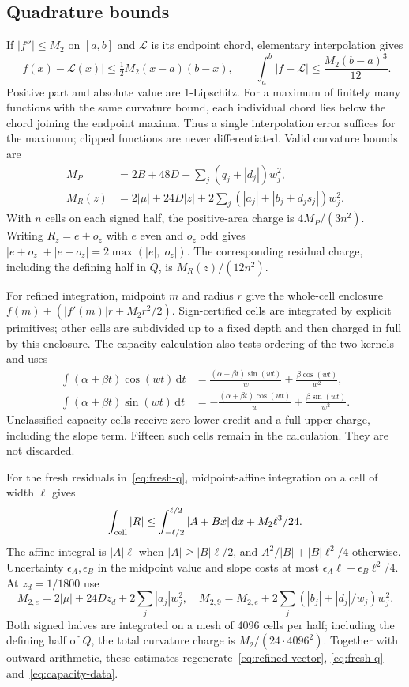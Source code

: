 \documentclass[10pt]{article}
\newcommand{\dd}{\,\mathrm d}
\begin{document}
\subsection{Quadrature bounds}
If $|f''|\leq M_2$ on $[a,b]$ and $\mathcal L$ is its endpoint chord, elementary interpolation gives
\[
|f(x)-\mathcal L(x)|\leq\tfrac12M_2(x-a)(b-x),\qquad
\int_a^b|f-\mathcal L|\leq\frac{M_2(b-a)^3}{12}.
\]
Positive part and absolute value are 1-Lipschitz.
For a maximum of finitely many functions with the same curvature bound, each individual chord lies below the chord joining the endpoint maxima. Thus a single interpolation error suffices for the maximum; clipped functions are never differentiated.
Valid curvature bounds are
\begin{align*}
M_P&=2B+48D+\sum_j(q_j+|d_j|)w_j^2,\\
M_R(z)&=2|\mu|+24D|z|+2\sum_j(|a_j|+|b_j+d_js_j|)w_j^2.
\end{align*}
With $n$ cells on each signed half, the positive-area charge is $4M_P/(3n^2)$.
Writing $R_z=e+o_z$ with $e$ even and $o_z$ odd gives
$|e+o_z|+|e-o_z|=2\max(|e|,|o_z|)$.
The corresponding residual charge, including the defining half in $Q$, is $M_R(z)/(12n^2)$.

For refined integration, midpoint $m$ and radius $r$ give the whole-cell enclosure
$f(m)\pm(|f'(m)|r+M_2r^2/2)$.
Sign-certified cells are integrated by explicit primitives; other cells are subdivided up to a fixed depth and then charged in full by this enclosure.
The capacity calculation also tests ordering of the two kernels and uses
\begin{align*}
\int(\alpha+\beta t)\cos(wt)\dd t
 &=\frac{(\alpha+\beta t)\sin(wt)}w+\frac{\beta\cos(wt)}{w^2},\\
\int(\alpha+\beta t)\sin(wt)\dd t
 &=-\frac{(\alpha+\beta t)\cos(wt)}w+\frac{\beta\sin(wt)}{w^2}.
\end{align*}
Unclassified capacity cells receive zero lower credit and a full upper charge, including the slope term. Fifteen such cells remain in the calculation. They are not discarded.

For the fresh residuals in~\eqref{eq:fresh-q}, midpoint-affine integration on a cell of width $\ell$ gives
\[
\int_{\rm cell}|R|\leq\int_{-\ell/2}^{\ell/2}|A+Bx|\dd x+M_2\ell^3/24.
\]
The affine integral is $|A|\ell$ when $|A|\geq|B|\ell/2$, and
$A^2/|B|+|B|\ell^2/4$ otherwise.
Uncertainty $\epsilon_A,\epsilon_B$ in the midpoint value and slope costs at most
$\epsilon_A\ell+\epsilon_B\ell^2/4$.
At $z_d=1/1800$ use
\[
M_{2,e}=2|\mu|+24Dz_d+2\sum_j|a_j|w_j^2,\quad
M_{2,9}=M_{2,e}+2\sum_j(|b_j|+|d_j|/w_j)w_j^2.
\]
Both signed halves are integrated on a mesh of 4096 cells per half; including the defining half of $Q$, the total curvature charge is $M_2/(24\cdot4096^2)$.
Together with outward arithmetic, these estimates regenerate~\eqref{eq:refined-vector}, \eqref{eq:fresh-q} and~\eqref{eq:capacity-data}.


\end{document}
